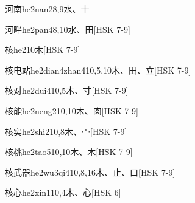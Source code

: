 \begin{EntryWithPhonetic}{河南}{he2nan2}{8,9}{⽔、⼗}
\end{EntryWithPhonetic}

\begin{EntryWithPhonetic}{河畔}{he2pan4}{8,10}{⽔、⽥}[HSK 7-9]
\end{EntryWithPhonetic}

\begin{EntryWithPhonetic}{核}{he2}{10}{⽊}[HSK 7-9]
\end{EntryWithPhonetic}

\begin{EntryWithPhonetic}{核电站}{he2dian4zhan4}{10,5,10}{⽊、⽥、⽴}[HSK 7-9]
\end{EntryWithPhonetic}

\begin{EntryWithPhonetic}{核对}{he2dui4}{10,5}{⽊、⼨}[HSK 7-9]
\end{EntryWithPhonetic}

\begin{EntryWithPhonetic}{核能}{he2neng2}{10,10}{⽊、⾁}[HSK 7-9]
\end{EntryWithPhonetic}

\begin{EntryWithPhonetic}{核实}{he2shi2}{10,8}{⽊、⼧}[HSK 7-9]
\end{EntryWithPhonetic}

\begin{EntryWithPhonetic}{核桃}{he2tao5}{10,10}{⽊、⽊}[HSK 7-9]
\end{EntryWithPhonetic}

\begin{EntryWithPhonetic}{核武器}{he2wu3qi4}{10,8,16}{⽊、⽌、⼝}[HSK 7-9]
\end{EntryWithPhonetic}

\begin{EntryWithPhonetic}{核心}{he2xin1}{10,4}{⽊、⼼}[HSK 6]
\end{EntryWithPhonetic}

